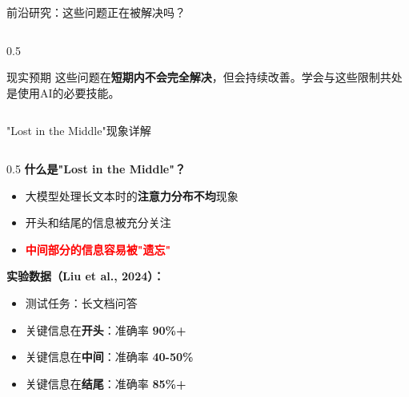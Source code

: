 \documentclass[aspectratio=169,11pt]{beamer}
\begin{document}
\begin{frame}{前沿研究：这些问题正在被解决吗？}
\begin{columns}
\begin{column}{0.5\textwidth}
            \vspace{0.3cm}
            \begin{block}{现实预期}
                \small
                这些问题在\textbf{短期内不会完全解决}，但会持续改善。学会与这些限制共处是使用AI的必要技能。
            \end{block}
        \end{column}
    \end{columns}
\end{frame}

\begin{frame}{"Lost in the Middle"现象详解}
    \begin{columns}
        \begin{column}{0.5\textwidth}
            \textbf{什么是"Lost in the Middle"？}
            \begin{itemize}
                \item 大模型处理长文本时的\textbf{注意力分布不均}现象
                \item 开头和结尾的信息被充分关注
                \item \textcolor{red}{\textbf{中间部分的信息容易被"遗忘"}}
            \end{itemize}
            
            \vspace{0.3cm}
            \textbf{实验数据（Liu et al., 2024）：}
            \begin{itemize}
                \item 测试任务：长文档问答
                \item 关键信息在\textbf{开头}：准确率 \textbf{90\%+}
                \item 关键信息在\textbf{中间}：准确率 \textbf{40-50\%}
                \item 关键信息在\textbf{结尾}：准确率 \textbf{85\%+}
            \end{itemize}
            

\end{column}
\end{columns}
\end{frame}
\end{document}
